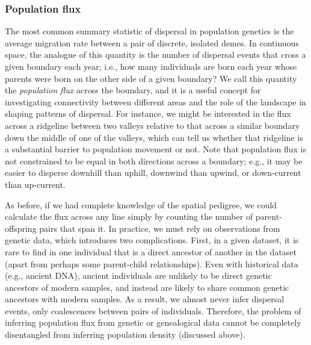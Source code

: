 \documentclass{ar-1col}
\begin{document}


\subsubsection{Population flux}

The most common summary statistic of dispersal in population genetics
is the average migration rate between a pair of discrete, isolated demes.
In continuous space, the analogue of this quantity
is the number of dispersal events that cross
a given boundary each year;
i.e., how many individuals are born each year whose parents
were born on the other side of a given boundary?
We call this quantity the \textit{population flux} across the boundary,
and it is a useful concept for investigating connectivity between different areas
and the role of the landscape in shaping patterns of dispersal.
For instance,
we might be interested in the flux across a ridgeline between two valleys
relative to that across a similar boundary down the middle of one of the valleys,
which can tell us whether that ridgeline is a substantial barrier to population movement or not.
Note that population flux is not constrained to be equal in both directions across a boundary;
e.g., it may be easier to disperse downhill than uphill,
downwind than upwind,
or down-current than up-current.

As before, if we had complete knowledge of the spatial pedigree,
we could calculate the flux across any line simply by counting the number of
parent-offspring pairs that span it.
In practice, we must rely on observations from genetic data,
which introduces two complications.
First, in a given dataset, it is rare to find in one individual
that is a direct ancestor of another in the dataset
(apart from perhaps some parent-child relationships).
Even with historical data (e.g., ancient DNA),
ancient individuals are unlikely to be direct genetic ancestors of modern samples,
and instead are likely to share common genetic ancestors with modern samples.
As a result, we almost never infer dispersal events,
only coalescences between pairs of individuals.
Therefore, the problem of inferring population flux from genetic or genealogical data
cannot be completely disentangled from inferring population density (discussed above).
\end{document}

